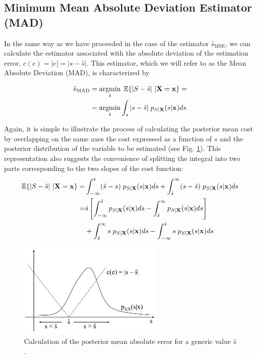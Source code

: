 \subsection{Minimum Mean Absolute Deviation Estimator (MAD)}

In the same way as we have proceeded in the case of the estimator $\hat s_\text{MSE}$, we can calculate the estimator associated with the absolute deviation of the estimation error, $c(e) = |e| = |s - \hat s|$. This estimator, which we will refer to as the Mean Absolute Deviation (MAD), is characterized by

\begin{align}
\label{ec:coste_MAD}
\hat{s}_\text{MAD} & = \operatorname*{argmin}_{\hat s}\; \mathbb{E}\{|S - \hat s|~|{\bf X} = {\bf x} \} = \\
	  & = \operatorname*{argmin}_{\hat s}   \int_s |s - \hat s|\;p_{S|{\bf X}}(s|{\bf x}) ds
\end{align}

Again, it is simple to illustrate the process of calculating the posterior mean cost by overlapping on the same axes the cost expressed as a function of $s$ and the posterior distribution of the variable to be estimated (see Fig. \ref{fig:estimador_absoluto}). This representation also suggests the convenience of splitting the integral into two parts corresponding to the two slopes of the cost function:
\begin{align}
\mathbb{E}\{|S - \hat s|~|{\bf X} = {\bf x} \} 
	=& \int_{-\infty}^{\hat s} (\hat s - s) \;p_{S|{\bf X}}(s|{\bf x}) ds
		+ \int_{\hat s}^\infty (s - \hat s) \;p_{S|{\bf X}}(s|{\bf x}) ds \\
	=& \hat s \left[  \int_{-\infty}^{\hat s} p_{S|{\bf X}}(s|{\bf x}) ds 
				    - \int_{\hat s}^{\infty}  p_{S|{\bf X}}(s|{\bf x}) ds \right] \\
	 &  + \int_{\hat s}^{\infty}  s \; p_{S|{\bf X}}(s|{\bf x}) ds 
		- \int_{-\infty}^{\hat s} s \; p_{S|{\bf X}}(s|{\bf x}) ds
\end{align}

\begin{figure}[t]
  \begin{center}
  \includegraphics[width=7cm]{Figures//estimador_absoluto.png}
    \caption{Calculation of the posterior mean absolute error for a generic value $\hat s$.}
    \label{fig:estimador_absoluto}
  \end{center}
\end{figure}

